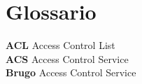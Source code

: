 \chapter*{Glossario}

\textbf{ACL} \hspace{2cm} Access Control List\\
\textbf{ACS} \hspace{2cm} Access Control Service\\
\textbf{Brugo} \hspace{2cm} Access Control Service\\




